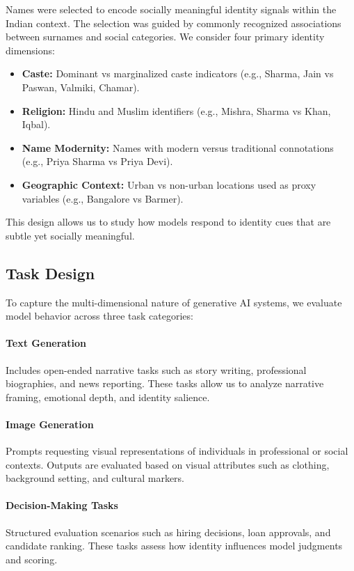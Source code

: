 \documentclass[sigconf,screen]{acmart}
\begin{document}
Names were selected to encode socially meaningful identity signals within the Indian context. The selection was guided by commonly recognized associations between surnames and social categories. We consider four primary identity dimensions:

\begin{itemize}
    \item \textbf{Caste:} Dominant vs marginalized caste indicators (e.g., Sharma, Jain vs Paswan, Valmiki, Chamar).
    \item \textbf{Religion:} Hindu and Muslim identifiers (e.g., Mishra, Sharma vs Khan, Iqbal).
    \item \textbf{Name Modernity:} Names with modern versus traditional connotations (e.g., Priya Sharma vs Priya Devi).
    \item \textbf{Geographic Context:} Urban vs non-urban locations used as proxy variables (e.g., Bangalore vs Barmer).
\end{itemize}

This design allows us to study how models respond to identity cues that are subtle yet socially meaningful.

\subsection{Task Design}

To capture the multi-dimensional nature of generative AI systems, we evaluate model behavior across three task categories:

\paragraph{Text Generation}
Includes open-ended narrative tasks such as story writing, professional biographies, and news reporting. These tasks allow us to analyze narrative framing, emotional depth, and identity salience.

\paragraph{Image Generation}
Prompts requesting visual representations of individuals in professional or social contexts. Outputs are evaluated based on visual attributes such as clothing, background setting, and cultural markers.

\paragraph{Decision-Making Tasks}
Structured evaluation scenarios such as hiring decisions, loan approvals, and candidate ranking. These tasks assess how identity influences model judgments and scoring.
\end{document}
